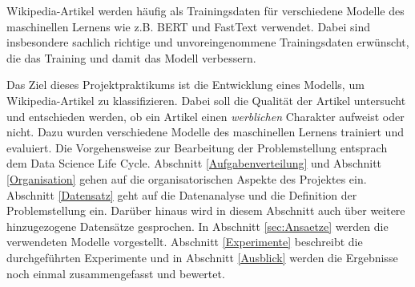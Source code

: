 \label{Einleitung}
Wikipedia-Artikel werden häufig als Trainingsdaten für verschiedene Modelle des maschinellen Lernens wie z.B. BERT \cite{Devlin2018} und FastText \cite{Bojanowski2016} verwendet. Dabei sind insbesondere sachlich richtige und unvoreingenommene Trainingsdaten erwünscht, die das Training und damit das Modell verbessern.

Das Ziel dieses Projektpraktikums ist die Entwicklung eines Modells, um Wikipedia-Artikel zu klassifizieren. Dabei soll die Qualität der Artikel untersucht und entschieden werden, ob ein Artikel einen \textit{werblichen} Charakter aufweist oder nicht. Dazu wurden verschiedene Modelle des maschinellen Lernens trainiert und evaluiert. Die Vorgehensweise zur Bearbeitung der Problemstellung entsprach dem Data Science Life Cycle. Abschnitt \ref{Aufgabenverteilung} und Abschnitt \ref{Organisation} gehen auf die organisatorischen Aspekte des Projektes ein. Abschnitt \ref{Datensatz} geht auf die Datenanalyse und die Definition der Problemstellung ein. Darüber hinaus wird in diesem Abschnitt auch über weitere hinzugezogene Datensätze gesprochen. In Abschnitt \ref{sec:Ansaetze} werden die verwendeten Modelle vorgestellt.
Abschnitt \ref{Experimente} beschreibt die durchgeführten Experimente und in Abschnitt \ref{Ausblick} werden die Ergebnisse noch einmal zusammengefasst und bewertet.

